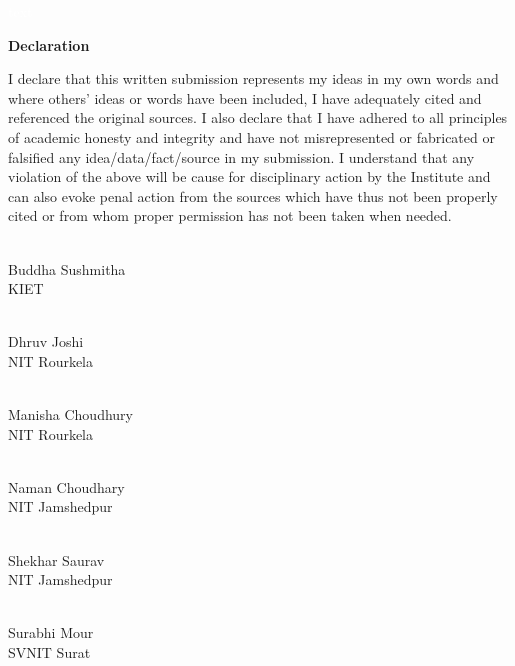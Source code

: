 \documentclass[12pt]{book}
\begin{document}
 \pagebreak \thispagestyle{empty} \textcolor{white}{text} \pagebreak
 
\LARGE
\thispagestyle{empty}

\begin{center}
\textbf{Declaration}
\end{center}
\normalsize
I declare that this written submission represents my ideas in my own words and where 
others' ideas or words have been included, I have adequately cited and referenced the original 
sources.  I also declare that I have adhered to all principles of academic honesty and integrity 
and   have   not   misrepresented   or   fabricated   or   falsified   any   idea/data/fact/source   in   my 
submission.  I understand that any violation of the above will be cause for disciplinary action 
by the Institute and can also evoke  penal action from the sources which have thus not been 
properly cited or from whom proper permission has not been taken when needed.

\vfill
\begin{flushright}

\underline{\hspace{5cm}} \\
Buddha Sushmitha \\
KIET \\


\vfill

\underline{\hspace{5cm}} \\
Dhruv Joshi \\
NIT Rourkela \\


\vfill

\underline{\hspace{5cm}} \\
Manisha Choudhury \\ 
NIT Rourkela \\


\vfill

\underline{\hspace{5cm}} \\
Naman Choudhary \\
NIT Jamshedpur \\

\vfill

\underline{\hspace{5cm}} \\
Shekhar Saurav \\
NIT Jamshedpur \\

\vfill

\underline{\hspace{5cm}} \\
Surabhi Mour \\
SVNIT Surat \\

\end{flushright}
\end{document}
